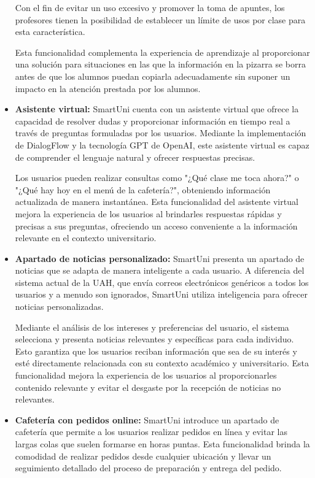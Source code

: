 \documentclass[12pt]{report}
\begin{document}
\begin{itemize}
Con el fin de evitar un uso excesivo y promover la toma de apuntes, los profesores tienen la posibilidad de establecer un límite de usos por clase para esta característica.

Esta funcionalidad complementa la experiencia de aprendizaje al proporcionar una solución para situaciones en las que la información en la pizarra se borra antes de que los alumnos puedan copiarla adecuadamente sin suponer un impacto en la atención prestada por los alumnos.

\item \textbf{Asistente virtual:} SmartUni cuenta con un asistente virtual que ofrece la capacidad de resolver dudas y proporcionar información en tiempo real a través de preguntas formuladas por los usuarios. Mediante la implementación de DialogFlow y la tecnología GPT de OpenAI, este asistente virtual es capaz de comprender el lenguaje natural y ofrecer respuestas precisas.

Los usuarios pueden realizar consultas como "¿Qué clase me toca ahora?" o "¿Qué hay hoy en el menú de la cafetería?", obteniendo información actualizada de manera instantánea. Esta funcionalidad del asistente virtual mejora la experiencia de los usuarios al brindarles respuestas rápidas y precisas a sus preguntas, ofreciendo un acceso conveniente a la información relevante en el contexto universitario.

\item \textbf{Apartado de noticias personalizado:} SmartUni presenta un apartado de noticias que se adapta de manera inteligente a cada usuario. A diferencia del sistema actual de la UAH, que envía correos electrónicos genéricos a todos los usuarios y a menudo son ignorados, SmartUni utiliza inteligencia para ofrecer noticias personalizadas.

Mediante el análisis de los intereses y preferencias del usuario, el sistema selecciona y presenta noticias relevantes y específicas para cada individuo. Esto garantiza que los usuarios reciban información que sea de su interés y esté directamente relacionada con su contexto académico y universitario. Esta funcionalidad mejora la experiencia de los usuarios al proporcionarles contenido relevante y evitar el desgaste por la recepción de noticias no relevantes.

\item \textbf{Cafetería con pedidos online:} SmartUni introduce un apartado de cafetería que permite a los usuarios realizar pedidos en línea y evitar las largas colas que suelen formarse en horas puntas. Esta funcionalidad brinda la comodidad de realizar pedidos desde cualquier ubicación y llevar un seguimiento detallado del proceso de preparación y entrega del pedido.


\end{itemize}
\end{document}

